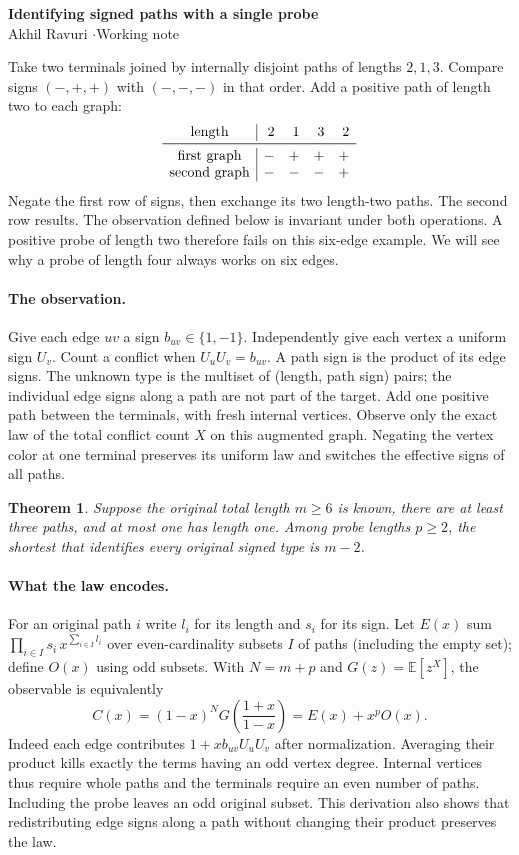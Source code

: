 \documentclass[11pt]{article}
\newtheorem*{theorem}{Theorem}
\begin{document}
\begin{center}
{\Large\bfseries Identifying signed paths with a single probe}\\[5pt]
Akhil Ravuri \quad$\cdot$\quad Working note
\end{center}

Take two terminals joined by internally disjoint paths of lengths $2,1,3$.
Compare signs $(-,+,+)$ with $(-,-,-)$ in that order. Add a positive
path of length two to each graph:
\[
\begin{array}{c|rrrr}
\text{length}&2&1&3&2\\\midrule
\text{first graph}&-&+&+&+\\
\text{second graph}&-&-&-&+
\end{array}
\]
Negate the first row of signs, then exchange its two length-two paths.
The second row results. The observation defined below is invariant under
both operations. A positive probe of length two therefore fails on this
six-edge example. We will see why a probe of length four always works
on six edges.

\paragraph{The observation.}
Give each edge $uv$ a sign $b_{uv}\in\{1,-1\}$. Independently give each
vertex a uniform sign $U_v$. Count a conflict when
$U_u U_v=b_{uv}$. A path sign is the product of its edge signs.
The unknown type is the multiset of (length, path sign) pairs; the
individual edge signs along a path are not part of the target.
Add one positive path between the terminals, with fresh internal vertices.
Observe only the exact law of the total conflict count $X$ on this augmented
graph. Negating the vertex color at one terminal preserves its uniform law
and switches the effective signs of all paths.

\begin{theorem}
Suppose the original total length $m\ge6$ is known, there are at least
three paths, and at most one has length one. Among probe lengths $p\ge2$,
the shortest that identifies every original signed type is $m-2$.
\end{theorem}

\paragraph{What the law encodes.}
For an original path $i$ write $l_i$ for its length and $s_i$ for its sign.
Let $E(x)$ sum $\prod_{i\in I}s_i\,x^{\sum_{i\in I}l_i}$ over even-cardinality
subsets $I$ of paths (including the empty set); define $O(x)$ using odd
subsets. With $N=m+p$ and $G(z)=\mathbb E[z^X]$, the observable is
equivalently
\[
 C(x)=(1-x)^N G\!\left(\frac{1+x}{1-x}\right)=E(x)+x^p O(x).
\]
Indeed each edge contributes $1+x b_{uv}U_uU_v$ after normalization.
Averaging their product kills exactly the terms having an odd vertex degree.
Internal vertices thus require whole paths and the terminals require an
even number of paths. Including the probe leaves an odd original subset.
This derivation also shows that redistributing edge signs along a path
without changing their product preserves the law.
\end{document}
